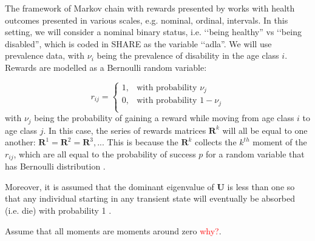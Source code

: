 \documentclass[\main/main.tex]{subfiles}
\begin{document}
The framework of Markov chain with rewards presented by \cite{Caswell2018} works with health outcomes presented in various scales, e.g. nominal, ordinal, intervals. In this setting, we will consider a nominal binary status, i.e. \lq\lq being healthy'' vs \lq\lq being disabled'', which is coded in SHARE as the variable \lq\lq adla''.
We will use prevalence data, with $\nu_i$ being the prevalence of disability in the age class $i$. Rewards are modelled as a Bernoulli random variable:

\begin{equation}
  r_{ij} = \begin{cases}
        1, & \text{with probability } \nu_j\\
        0, & \text{with probability } 1-\nu_j\\
        \end{cases}
\end{equation}
with $\nu_j$ being the probability of gaining a reward while moving from age class $i$ to age class $j$. In this case, the series of rewards matrices $\mathbf{R}^k$ will all be equal to one another: $\mathbf{R}^1= \mathbf{R}^2 =\mathbf{R}^3, ..$. This is because the $\mathbf{R}^k$ collects the $k^{th}$ moment of the $r_{ij}$, which are all equal to the probability of success $p$  for a random variable that has Bernoulli distribution \citep{forbes2011}. 



Moreover, it is assumed that the dominant eigenvalue of $\mathbf{U}$ is less than one so that any individual starting in any transient state will eventually be absorbed (i.e. die) with probability 1 \citep{Caswell2011}.


Assume that all moments are moments around zero \citep{Caswell2018} \textcolor{red}{why?}. 
\end{document}
